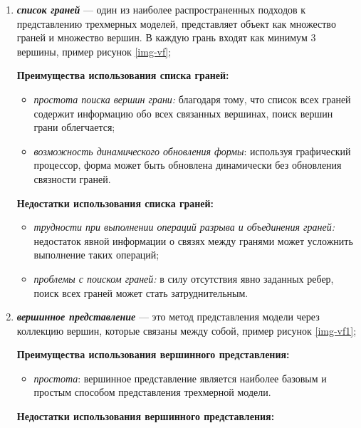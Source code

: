 \begin{enumerate}
	\item \textbf{\textit{список граней}} ---  один из наиболее распространенных подходов к представлению трехмерных моделей, представляет объект как множество граней и множество вершин. В каждую грань входят как минимум 3 вершины, пример рисунок  \ref{img-vf};
	   
  	\textbf{Преимущества использования списка граней:}
  
	\begin{itemize}
		\item \textit{простота поиска вершин грани: }благодаря тому, что список всех граней содержит информацию обо всех связанных вершинах, поиск вершин грани облегчается;
		\item \textit{возможность динамического обновления формы}: используя графический процессор, форма может быть обновлена динамически без обновления связности граней.
	\end{itemize}
			 	
	\textbf{Недостатки использования списка граней:}
	
	\begin{itemize}
	\item\textit{трудности при выполнении операций разрыва и объединения граней:} недостаток явной информации о связях между гранями может усложнить выполнение таких операций;
	\item \textit{проблемы с поиском граней: }в силу отсутствия явно заданных ребер, поиск всех граней может стать затруднительным.
	\end{itemize}
		
	
	\item \textit{\textbf{вершинное представление}} --- это метод представления модели через коллекцию вершин, которые связаны между собой, пример рисунок  \ref{img-vf1};
	
	
	\textbf{Преимущества использования вершинного представления:}
	
	\begin{itemize}
		\item \textit{простота}: вершинное представление является наиболее базовым и простым способом представления трехмерной модели.
	\end{itemize}

	\textbf{Недостатки использования вершинного представления:}


\end{enumerate}
